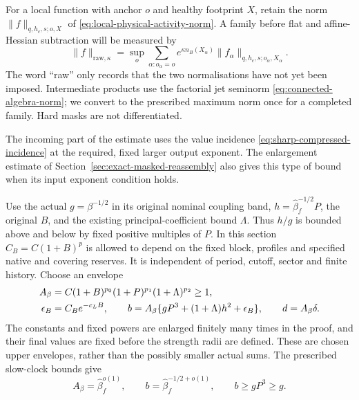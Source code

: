 \documentclass[11pt,reqno]{amsart}
\numberwithin{equation}{section}
\theoremstyle{definition}
\theoremstyle{remark}
\begin{document}
For a local function with anchor \(o\) and healthy footprint
\(X\), retain the norm
\(\|f\|_{q,h_c,s;o,X}\) of
\eqref{eq:local-physical-activity-norm}. A family before flat
and affine-Hessian subtraction will be measured by
\begin{equation}
 \|f\|_{\mathrm{raw},\kappa}
   =\sup_o\sum_{\alpha:o_\alpha=o}
        e^{\kappa n_B(X_\alpha)}
              \|f_\alpha\|_{q,h_c,s;o_\alpha,X_\alpha}.
 \label{eq:central-raw-family-norm}
\end{equation}
The word ``raw'' only records that the two normalisations
have not yet been imposed. Intermediate products use the
factorial jet seminorm \eqref{eq:connected-algebra-norm};
we convert to the prescribed maximum norm once for a completed
family. Hard masks are not differentiated.

The incoming part of the estimate uses the value incidence
\eqref{eq:sharp-compressed-incidence} at the required, fixed
larger output exponent. The enlargement estimate of
Section~\ref{sec:exact-masked-reassembly} also gives this type
of bound when its input exponent condition holds.

Use the actual \(g=\beta^{-1/2}\) in its original nominal
coupling band, \(h=\widehat\beta_f^{-1/2}P\), the original
\(B\), and the existing principal-coefficient bound
\(\Lambda\). Thus \(h/g\) is bounded above and below by fixed
positive multiples of \(P\). In this section \(C_B=C(1+B)^p\) is allowed
to depend on the fixed block, profiles and specified native
and covering reserves. It is independent of period, cutoff,
sector and finite history. Choose an envelope
\begin{align}
 A_\beta&=C(1+B)^{p_0}(1+P)^{p_1}(1+\Lambda)^{p_2}\ge1,
                                                        \notag\\
 \epsilon_B&=C_Be^{-c_LB},\qquad
 b=A_\beta\{gP^3+(1+\Lambda)h^2+\epsilon_B\},
                \qquad d=A_\beta\delta .
 \label{eq:central-strength-incomes}
\end{align}
The constants and fixed powers are enlarged finitely many
times in the proof, and their final values are fixed before
the strength radii are defined. These are chosen upper
envelopes, rather than the possibly smaller actual sums.
The prescribed slow-clock bounds give
\begin{equation}
 A_\beta=\widehat\beta_f^{o(1)},\qquad
 b=\widehat\beta_f^{-1/2+o(1)},\qquad b\ge gP^3\ge g.
 \label{eq:central-strength-rates}
\end{equation}
\end{document}

